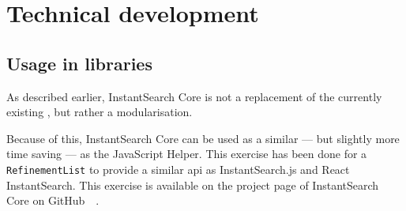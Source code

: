 
\chapter{Technical development} %
\label{chp:execution}








\section{Usage in libraries} %
\label{sec:usage_in_libraries}

As described earlier, InstantSearch Core\cite{is-core} is not a replacement of the currently existing , but rather a modularisation. 

Because of this, InstantSearch Core can be used as a similar --- but slightly more time saving --- as the JavaScript Helper. This exercise has been done for a {\tt RefinementList} to provide a similar \acrshort{api} as InstantSearch.js and React InstantSearch. This exercise is available on the project page of InstantSearch Core on GitHub~\cite{is-core}~.

